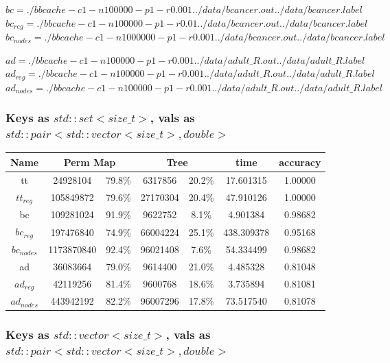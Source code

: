 \documentclass[]{article}
\theoremstyle{definition}
\begin{document}
$bc = ./bbcache -c 1 -n 100000 -p 1 -r 0.001 ../data/bcancer.out ../data/bcancer.label$
$bc_{reg} = ./bbcache -c 1 -n 100000 -p 1 -r 0.01 ../data/bcancer.out ../data/bcancer.label$
$bc_{nodes} = ./bbcache -c 1 -n 1000000 -p 1 -r 0.001 ../data/bcancer.out ../data/bcancer.label$

$ad = ./bbcache -c 1 -n 100000 -p 1 -r 0.001 ../data/adult\_R.out ../data/adult\_R.label$
$ad_{reg} = ./bbcache -c 1 -n 100000 -p 1 -r 0.001 ../data/adult\_R.out ../data/adult\_R.label$
$ad_{nodes} = ./bbcache -c 1 -n 100000 -p 1 -r 0.001 ../data/adult\_R.out ../data/adult\_R.label$

\subsubsection{Keys as $std::set<size\_t>$, vals as $std::pair<std::vector<size\_t>, double>$}

\begin{center}
\begin{tabular} { |c|c|c|c|c|c|c| }
\hline
Name & \multicolumn{2}{c|}{Perm Map} & \multicolumn{2}{c|}{Tree} & time & accuracy \\
\hline
tt & 24928104 & 79.8\%  & 6317856 & 20.2\% & 17.601315 & 1.00000 \\

$tt_{reg}$ & 105849872 & 79.6\% & 27170304 & 20.4\% & 47.910126 & 1.00000 \\

bc &109281024 & 91.9\% & 9622752 & 8.1\% & 4.901384 & 0.98682 \\

$bc_{reg}$ & 197476840 & 74.9\% & 66004224 & 25.1\% & 438.309378 & 0.95168 \\

$bc_{nodes}$ & 1173870840 & 92.4\% & 96021408 & 7.6\% & 54.334499 & 0.98682 \\

ad & 36083664 & 79.0\% & 9614400 & 21.0\% & 4.485328 & 0.81048 \\

$ad_{reg}$ & 42119256 & 81.4\% & 9600768 & 18.6\% & 3.735894 & 0.81081 \\

$ad_{nodes}$ & 443942192 & 82.2\% & 96007296 & 17.8\% & 73.517540 & 0.81078 \\
\hline
\end{tabular}
\end{center}

\subsubsection{Keys as $std::vector<size\_t>$, vals as $std::pair<std::vector<size\_t>, double>$}
\end{document}
